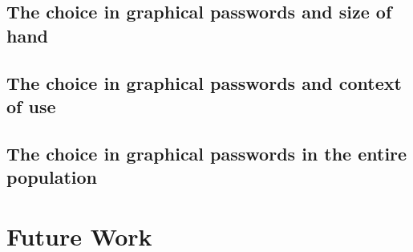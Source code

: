     \subsection*{The choice in graphical passwords and size of hand}

    \subsection*{The choice in graphical passwords and context of use}

    \subsection*{The choice in graphical passwords in the entire population}




  \clearpage
  \section{Future Work}



